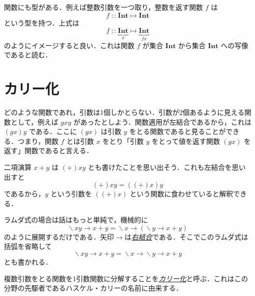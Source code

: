 \documentclass[a4paper,draft]{jsbook}
\newcommand{\keyword}[1]{{\underline{\emph{#1}}}}
\newcommand{\mType}[1]{\mathbf{#1}}
\newcommand{\mIntType}{\mType{Int}}
\DeclareMathOperator{\mLambda}{\backslash}
\DeclareMathOperator{\mLambdaArrow}{\rightarrow}
\DeclareMathOperator{\mIn}{{:\!:}}
\DeclareMathOperator{\mMapsTo}{\mapsto}
\newcommand{\mLambdaExp}[2]{\mLambda{#1}\mLambdaArrow{#2}}
\newcommand{\mProjection}[2]{#1\mMapsTo#2}
\begin{document}
関数にも型がある．例えば整数引数を一つ取り，整数を返す関数 $f$ は
\begin{equation}
f\mIn\mProjection{\mIntType}{\mIntType}
\end{equation}
という型を持つ．上式は
\begin{equation}
f
\mIn\underbrace{\mIntType}_{x}
\mMapsTo
\underbrace{\mIntType}_{fx}
\end{equation}
のようにイメージすると良い．これは関数 $f$ が集合 $\mIntType$ から集合 $\mIntType$ への写像であると読む．

\section{カリー化}

どのような関数であれ，引数は1個しかとらない．引数が2個あるように見える関数として，例えば $gxy$ があったとしよう．関数適用が左結合であるから，これは $\left(gx\right)y$ である．ここに $\left(gx\right)$ は引数 $y$ をとる関数であると見ることができる．つまり，関数 $f$ とは引数 $x$ をとり「引数 $y$ をとって値を返す関数 $\left(gx\right)$ を返す」関数であると言える．

二項演算 $x+y$ は $(+)xy$ とも書けたことを思い出そう．これも左結合を思い出すと
\begin{equation}
(+)xy=\left((+)x\right)y
\end{equation}
であるから，$y$ という引数を $\left((+)x\right)$ という関数に食わせていると解釈できる．

ラムダ式の場合は話はもっと単純で，機械的に
\begin{equation}
\mLambdaExp{xy}{x+y}
=\mLambdaExp{x}{\left(\mLambdaExp{y}{x+y}\right)}
\end{equation}
のように展開するだけである．矢印$\mLambdaArrow$は\keyword{右結合}である．そこでこのラムダ式は括弧を省略して
\begin{equation}
\mLambdaExp{xy}{x+y}
=\mLambdaExp{x}{\mLambdaExp{y}{x+y}}
\end{equation}
とも書かれる．

複数引数をとる関数を1引数関数に分解することを\keyword{カリー化}と呼ぶ．これはこの分野の先駆者であるハスケル・カリーの名前に由来する．

\end{document}
